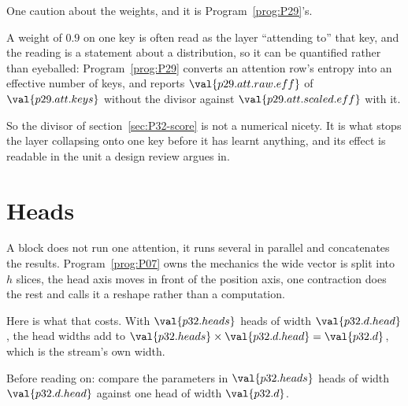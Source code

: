 \begin{fr}
One caution about the weights, and it is Program~\ref{prog:P29}'s.

A weight of $\num{0.9}$ on one key is often read as the layer \enquote{attending
to} that key, and the reading is a statement about a distribution, so it can
be quantified rather than eyeballed: Program~\ref{prog:P29} converts an
attention row's entropy into an effective number of keys, and reports
$\val{p29.att.raw.eff}$ of $\val{p29.att.keys}$ without the divisor against
$\val{p29.att.scaled.eff}$ with it.

So the divisor of section~\ref{sec:P32-score} is not a numerical nicety.
It is what stops the layer collapsing onto one key before it has learnt
anything, and its effect is readable in the unit a design review argues in.
\end{fr}

\section{Heads}
\label{sec:P32-heads}

\begin{fr}
A block does not run one attention, it runs several in parallel and
concatenates the results. Program~\ref{prog:P07} owns the mechanics
\dash{} the wide vector is split into $h$ slices, the head axis moves in
front of the position axis, one contraction does the rest \dash{} and calls
it a reshape rather than a computation.

Here is what that costs. With $\val{p32.heads}$ heads of width
$\val{p32.d.head}$, the head widths add to
$\val{p32.heads} \times \val{p32.d.head} = \val{p32.d}$, which is the
stream's own width.

Before reading on: compare the parameters in $\val{p32.heads}$ heads of
width $\val{p32.d.head}$ against one head of width $\val{p32.d}$.
\dotline
\nextframe
\end{fr}

